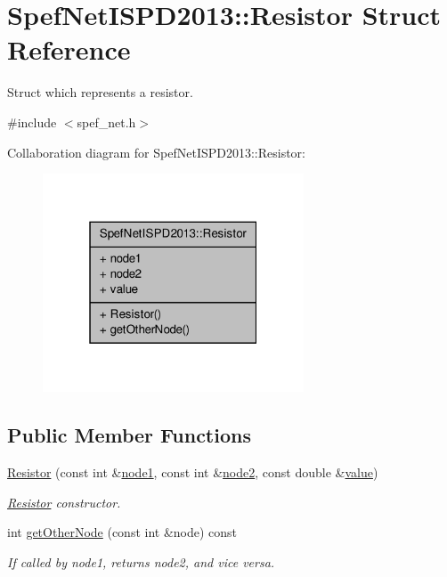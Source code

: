 \hypertarget{structSpefNetISPD2013_1_1Resistor}{\section{Spef\-Net\-I\-S\-P\-D2013\-:\-:Resistor Struct Reference}
\label{structSpefNetISPD2013_1_1Resistor}
}


Struct which represents a resistor.  




{\ttfamily \#include $<$spef\-\_\-net.\-h$>$}



Collaboration diagram for Spef\-Net\-I\-S\-P\-D2013\-:\-:Resistor\-:\nopagebreak
\begin{figure}[H]
\begin{center}
\leavevmode
\includegraphics[width=220pt]{structSpefNetISPD2013_1_1Resistor__coll__graph}
\end{center}
\end{figure}
\subsection*{Public Member Functions}
\begin{DoxyCompactItemize}
\item 
\hyperlink{structSpefNetISPD2013_1_1Resistor_ac84e89149ed6b112e9c7f65d6970eedc}{Resistor} (const int \&\hyperlink{structSpefNetISPD2013_1_1Resistor_a3916280dff15e9c4bccafdaba9d40bac}{node1}, const int \&\hyperlink{structSpefNetISPD2013_1_1Resistor_a7da9cba467501e28de314d284c3cf000}{node2}, const double \&\hyperlink{structSpefNetISPD2013_1_1Resistor_aa63c1d820917f71cd4ff2cbf1e83696d}{value})
\begin{DoxyCompactList}\small\item\em \hyperlink{structSpefNetISPD2013_1_1Resistor}{Resistor} constructor. \end{DoxyCompactList}\item 
int \hyperlink{structSpefNetISPD2013_1_1Resistor_a3a0476c9c8c01861071eb667cc79ca22}{get\-Other\-Node} (const int \&node) const 
\begin{DoxyCompactList}\small\item\em If called by node1, returns node2, and vice versa. \end{DoxyCompactList}\end{DoxyCompactItemize}
